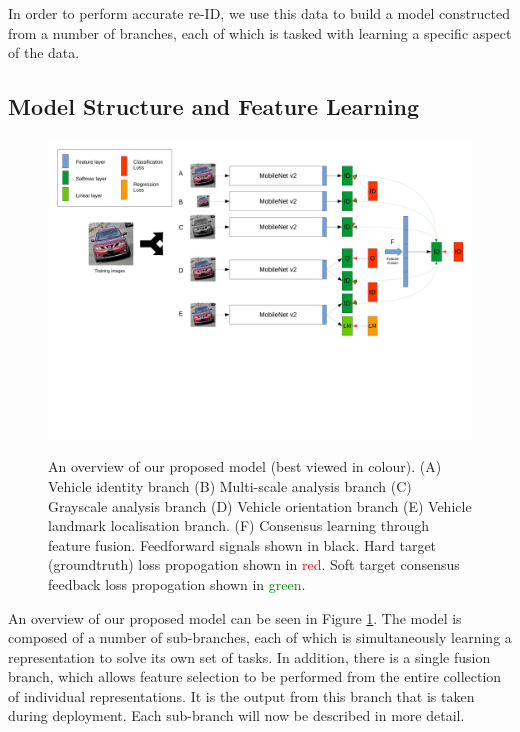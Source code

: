 \documentclass[10pt,twocolumn,letterpaper]{article}
\begin{document}
In order to perform accurate re-ID, we use this data to build a model constructed from a number of branches, each of which is tasked with learning a specific aspect of the data.

\subsection{Model Structure and Feature Learning}

\begin{figure}
  \includegraphics[width=\linewidth,trim=0cm 10cm 0cm 0cm,clip=true]{images/system_overview.pdf}
  \label{F:overview}
  \caption{An overview of our proposed model (best viewed in colour). (A) Vehicle identity branch (B) Multi-scale analysis branch (C) Grayscale analysis branch (D) Vehicle orientation branch (E) Vehicle landmark localisation branch. (F) Consensus learning through feature fusion. Feedforward signals shown in black. Hard target (groundtruth) loss propogation shown in \textcolor{red}{red}. Soft target consensus feedback loss propogation shown in \textcolor{green}{green}.}
\end{figure}

An overview of our proposed model can be seen in Figure \ref{F:overview}. The model is composed of a number of sub-branches, each of which is simultaneously learning a representation to solve its own set of tasks. In addition, there is a single fusion branch, which allows feature selection to be performed from the entire collection of individual representations. It is the output from this branch that is taken during deployment. Each sub-branch will now be described in more detail.
\end{document}
